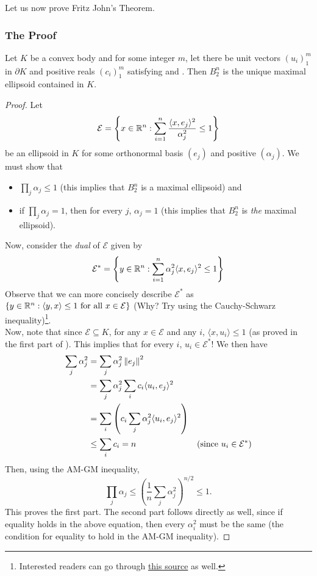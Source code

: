 Let us now prove Fritz John's Theorem.

\subsubsection{The Proof}

\begin{lemma}
\label{fritz johns theorem part 1}
Let $K$ be a convex body and for some integer $m$, let there be unit vectors $(u_i)_1^m$ in $\partial K$ and positive reals $(c_i)_1^m$ satisfying  and . Then $B_2^n$ is the unique maximal ellipsoid contained in $K$.
\end{lemma}
\begin{proof}
Let
\[ \mathcal{E} = \left\{x\in\mathbb{R}^n:\sum_{i=1}^n \frac{\langle x,e_j\rangle^2}{\alpha_j^2}\leq 1\right\} \]
be an ellipsoid in $K$ for some orthonormal basis $(e_j)$ and positive $(\alpha_j)$. We must show that
\begin{itemize}
    \item $\prod_j \alpha_j\leq 1$ (this implies that $B_2^n$ is a maximal ellipsoid) and
    \item if $\prod_j \alpha_j = 1$, then for every $j$, $\alpha_j = 1$ (this implies that $B_2^n$ is \textit{the} maximal ellipsoid).
\end{itemize}
Now, consider the \textit{dual} of $\mathcal{E}$ given by
\[ \mathcal{E}^* = \left\{y\in\mathbb{R}^n:\sum_{i=1}^n \alpha_j^2\langle x,e_j\rangle^2 \leq 1\right\} \]
Observe that we can more concisely describe $\mathcal{E}^*$ as $\{y\in\mathbb{R}^n:\langle y,x\rangle\leq 1\text{ for all }x\in\mathcal{E}\}$ (Why? Try using the Cauchy-Schwarz inequality)\footnote{Interested readers can go through \href{https://ocw.mit.edu/courses/mathematics/18-409-topics-in-theoretical-computer-science-an-algorithmists-toolkit-fall-2009/lecture-notes/MIT18_409F09_scribe11.pdf}{this source} as well.}.\\
Now, note that since $\mathcal{E}\subseteq K$, for any $x\in \mathcal{E}$ and any $i$, $\langle x,u_i\rangle\leq 1$ (as proved in the first part of ). This implies that for every $i$, $u_i\in\mathcal{E}^*$! We then have
\begin{align*}
    \sum_j \alpha_j^2 &= \sum_j \alpha_j^2 \left\lVert e_j\right\rVert^2 \\
    &= \sum_j \alpha_j^2 \sum_i c_i \langle u_i,e_j\rangle^2 \\
    &= \sum_i \left(c_i \sum_j \alpha_j^2\langle u_i,e_j\rangle^2 \right) \\
    &\leq \sum_i c_i = n & (\text{since }u_i\in\mathcal{E}^*)
\end{align*}
Then, using the AM-GM inequality,
\[ \prod_j \alpha_j \leq \left(\frac{1}{n}\sum_j \alpha_j^2\right)^{n/2} \leq 1. \]
This proves the first part. The second part follows directly as well, since if equality holds in the above equation, then every $\alpha_i^2$ must be the same (the condition for equality to hold in the AM-GM inequality).
\end{proof}

